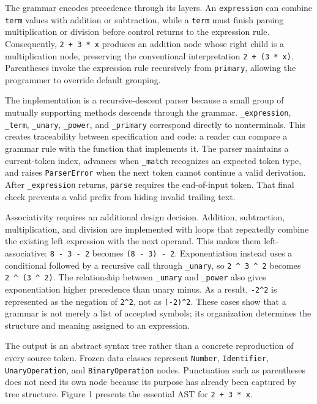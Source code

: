 \documentclass[12pt]{article}
\begin{document}
The grammar encodes precedence through its layers. An \texttt{expression} can combine \texttt{term} values with addition or subtraction, while a \texttt{term} must finish parsing multiplication or division before control returns to the expression rule. Consequently, \texttt{2\ +\ 3\ *\ x} produces an addition node whose right child is a multiplication node, preserving the conventional interpretation \texttt{2\ +\ (3\ *\ x)}. Parentheses invoke the expression rule recursively from \texttt{primary}, allowing the programmer to override default grouping.


The implementation is a recursive-descent parser because a small group of mutually supporting methods descends through the grammar. \texttt{\_expression}, \texttt{\_term}, \texttt{\_unary}, \texttt{\_power}, and \texttt{\_primary} correspond directly to nonterminals. This creates traceability between specification and code: a reader can compare a grammar rule with the function that implements it. The parser maintains a current-token index, advances when \texttt{\_match} recognizes an expected token type, and raises \texttt{ParserError} when the next token cannot continue a valid derivation. After \texttt{\_expression} returns, \texttt{parse} requires the end-of-input token. That final check prevents a valid prefix from hiding invalid trailing text.


Associativity requires an additional design decision. Addition, subtraction, multiplication, and division are implemented with loops that repeatedly combine the existing left expression with the next operand. This makes them left-associative: \texttt{8\ -\ 3\ -\ 2} becomes \texttt{(8\ -\ 3)\ -\ 2}. Exponentiation instead uses a conditional followed by a recursive call through \texttt{\_unary}, so \texttt{2\ \textasciicircum{}\ 3\ \textasciicircum{}\ 2} becomes \texttt{2\ \textasciicircum{}\ (3\ \textasciicircum{}\ 2)}. The relationship between \texttt{\_unary} and \texttt{\_power} also gives exponentiation higher precedence than unary minus. As a result, \texttt{-2\textasciicircum{}2} is represented as the negation of \texttt{2\textasciicircum{}2}, not as \texttt{(-2)\textasciicircum{}2}. These cases show that a grammar is not merely a list of accepted symbols; its organization determines the structure and meaning assigned to an expression.


The output is an abstract syntax tree rather than a concrete reproduction of every source token. Frozen data classes represent \texttt{Number}, \texttt{Identifier}, \texttt{UnaryOperation}, and \texttt{BinaryOperation} nodes. Punctuation such as parentheses does not need its own node because its purpose has already been captured by tree structure. Figure 1 presents the essential AST for \texttt{2\ +\ 3\ *\ x}.
\end{document}
